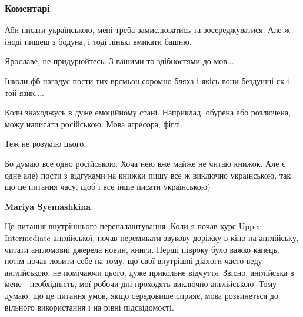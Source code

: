 
 
 
 
 
\subsubsection{Коментарі}

\begin{itemize} %

Аби писати українською, мені треба замислюватись та зосереджуватися. Але ж
іноді пишеш з бодуна, і тоді лінькі вмикати башню.

\begin{itemize} %
Ярославе, не придурюйтесь. З вашими то здібностями до мов...
\end{itemize} %

Інколи фб нагадує пости тих врємьон,соромно бляха і якісь вони бездушні як і той язик....

Коли знаходжусь в дуже емоційному стані. Наприклад, обурена або розлючена, можу написати російською. Мова агресора, фіглі.

Теж не розумію цього.


Бо думаю все одно російською. Хоча нею вже майже не читаю книжок. Але є одне
але) пости з відгуками на книжки пишу все ж виключно українською, так що це
питання часу, щоб і все інше писати українською)

\begin{itemize} %
\textbf{Mariya Syemashkina} 

Це питання внутрішнього переналаштування. Коли я почав курс Upper Intermediate
англійської, почав перемикати звукову доріжку в кіно на англійську, читати
англомовні джерела новин, книги. Перші півроку було важко капець, потім почав
ловити себе на тому, що свої внутрішні діалоги часто веду англійською, не
помічаючи цього, дуже прикольне відчуття. Звісно, англійська в мене -
необхідність, мої робочи дні проходять виключно англійською. Тому думаю, що це
питання умов, якщо середовище сприяє, мова розвинеться до вільного використання
і на рівні підсвідомості.



\end{itemize}
\end{itemize}
